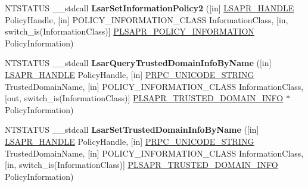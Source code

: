 \begin{DoxyCompactItemize}
\item 
\mbox{\label{interfacelsarpc_a632bcfc1d6f545ea9f32fa73491765ce}} 
N\+T\+S\+T\+A\+T\+US \+\_\+\+\_\+stdcall {\bfseries Lsar\+Set\+Information\+Policy2} (\mbox{[}in\mbox{]} \hyperlink{interfacevoid}{L\+S\+A\+P\+R\+\_\+\+H\+A\+N\+D\+LE} Policy\+Handle, \mbox{[}in\mbox{]} P\+O\+L\+I\+C\+Y\+\_\+\+I\+N\+F\+O\+R\+M\+A\+T\+I\+O\+N\+\_\+\+C\+L\+A\+SS Information\+Class, \mbox{[}in, switch\+\_\+is(Information\+Class)\mbox{]} \hyperlink{union___l_s_a_p_r___p_o_l_i_c_y___i_n_f_o_r_m_a_t_i_o_n}{P\+L\+S\+A\+P\+R\+\_\+\+P\+O\+L\+I\+C\+Y\+\_\+\+I\+N\+F\+O\+R\+M\+A\+T\+I\+ON} Policy\+Information)
\item 
\mbox{\label{interfacelsarpc_a14f6fbb1ea7d983130e38f21d8d66cd9}} 
N\+T\+S\+T\+A\+T\+US \+\_\+\+\_\+stdcall {\bfseries Lsar\+Query\+Trusted\+Domain\+Info\+By\+Name} (\mbox{[}in\mbox{]} \hyperlink{interfacevoid}{L\+S\+A\+P\+R\+\_\+\+H\+A\+N\+D\+LE} Policy\+Handle, \mbox{[}in\mbox{]} \hyperlink{struct___r_p_c___u_n_i_c_o_d_e___s_t_r_i_n_g}{P\+R\+P\+C\+\_\+\+U\+N\+I\+C\+O\+D\+E\+\_\+\+S\+T\+R\+I\+NG} Trusted\+Domain\+Name, \mbox{[}in\mbox{]} P\+O\+L\+I\+C\+Y\+\_\+\+I\+N\+F\+O\+R\+M\+A\+T\+I\+O\+N\+\_\+\+C\+L\+A\+SS Information\+Class, \mbox{[}out, switch\+\_\+is(Information\+Class)\mbox{]} \hyperlink{union___l_s_a_p_r___t_r_u_s_t_e_d___d_o_m_a_i_n___i_n_f_o}{P\+L\+S\+A\+P\+R\+\_\+\+T\+R\+U\+S\+T\+E\+D\+\_\+\+D\+O\+M\+A\+I\+N\+\_\+\+I\+N\+FO} $\ast$Policy\+Information)
\item 
\mbox{\label{interfacelsarpc_ae9ddcaee129f0a108596d67652fca8cb}} 
N\+T\+S\+T\+A\+T\+US \+\_\+\+\_\+stdcall {\bfseries Lsar\+Set\+Trusted\+Domain\+Info\+By\+Name} (\mbox{[}in\mbox{]} \hyperlink{interfacevoid}{L\+S\+A\+P\+R\+\_\+\+H\+A\+N\+D\+LE} Policy\+Handle, \mbox{[}in\mbox{]} \hyperlink{struct___r_p_c___u_n_i_c_o_d_e___s_t_r_i_n_g}{P\+R\+P\+C\+\_\+\+U\+N\+I\+C\+O\+D\+E\+\_\+\+S\+T\+R\+I\+NG} Trusted\+Domain\+Name, \mbox{[}in\mbox{]} P\+O\+L\+I\+C\+Y\+\_\+\+I\+N\+F\+O\+R\+M\+A\+T\+I\+O\+N\+\_\+\+C\+L\+A\+SS Information\+Class, \mbox{[}in, switch\+\_\+is(Information\+Class)\mbox{]} \hyperlink{union___l_s_a_p_r___t_r_u_s_t_e_d___d_o_m_a_i_n___i_n_f_o}{P\+L\+S\+A\+P\+R\+\_\+\+T\+R\+U\+S\+T\+E\+D\+\_\+\+D\+O\+M\+A\+I\+N\+\_\+\+I\+N\+FO} Policy\+Information)
\item 
\mbox{\label{interfacelsarpc_a36d2384d055bc6ae0dcbfe7552fa9584}} 

\end{DoxyCompactItemize}
